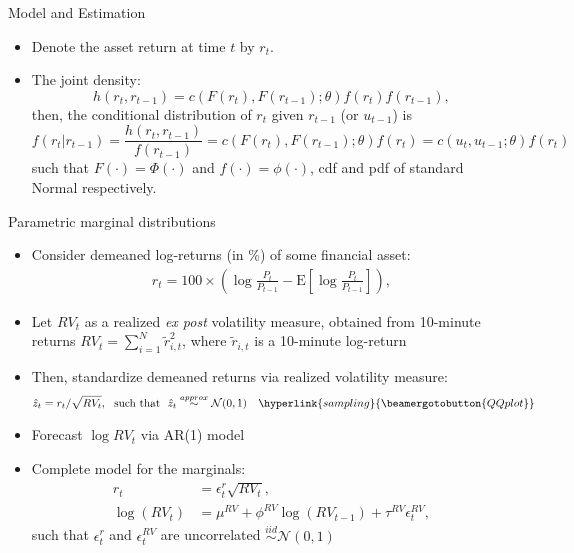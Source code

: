 \documentclass[9pt,xcolor=x11names,compress]{beamer}
\begin{document}
\begin{frame}{Model and Estimation}
	\begin{itemize}
		\item Denote the asset return at time $t$ by $r_t$.
		\item The joint density:
		\begin{equation*}
		h(r_t,r_{t-1}) = c(F(r_t), F(r_{t-1});\theta)f(r_t)f(r_{t-1}),
		\end{equation*}
		then, the conditional distribution of $r_t$ given $r_{t-1}$ (or $u_{t-1}$) is 
		\begin{equation*}
		f(r_t|r_{t-1}) =\frac{h(r_t,r_{t-1}) }{f(r_{t-1})} = c(F(r_t), F(r_{t-1});\theta)f(r_t) = c(u_t, u_{t-1};\theta)f(r_t)
		\end{equation*}
		such that $F(\cdot) = \Phi(\cdot)$ and $f(\cdot) = \phi(\cdot)$, cdf and pdf of standard Normal respectively.
	\end{itemize}
\end{frame}

\begin{frame}{Parametric marginal distributions}\label{rv}
	\begin{itemize}
		\item Consider demeaned  log-returns (in \%) of some financial asset:
		\begin{align*}
		r_t = 100\times\left(\log \frac{P_t}{P_{t-1}}-\text{E}\left[\log \frac{P_t}{P_{t-1}}\right]\right),
		\end{align*}
		\pause
		\item Let $RV_t$ as a realized \textit{ex post} volatility measure, obtained from 10-minute returns $RV_t = \sum_{i=1}^N \tilde{r}_{i,t}^2$, where $\tilde{r}_{i,t}$ is a 10-minute log-return %
		\pause
		\item Then, standardize demeaned returns via realized volatility measure: 
		\begin{align*}
		\hat{z}_t = r_t/\sqrt{RV_t},\:\:\:\text{such that}\:\:\:\hat{z}_t\stackrel{approx}{\sim}\mathcal{N}(0,1)\quad \hyperlink{sampling}{\beamergotobutton{QQ plot}}
		\end{align*}
		
		\pause
		\item Forecast $\log RV_t$ via AR(1) model
		\pause
		\item Complete model for the marginals:
		\begin{align}
		r_t &= \epsilon^{r}_t\sqrt{RV_t},\\
		\log(RV_t) &= \mu^{RV}+\phi^{RV}\log(RV_{t-1})+\tau^{RV}\epsilon^{RV}_t,
		\end{align}
		such that $\epsilon^r_t$ and $\epsilon^{RV}_t$ are uncorrelated $\stackrel{iid}{\sim}\mathcal{N}(0,1)$
\end{itemize}
\end{frame}
\end{document}
